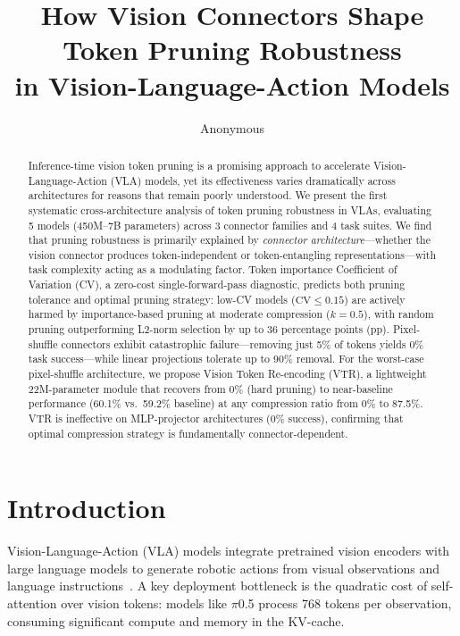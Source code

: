\documentclass[10pt,twocolumn]{article}
\title{How Vision Connectors Shape Token Pruning Robustness\\ in Vision-Language-Action Models}
\author{Anonymous}
\date{}
\begin{document}
\maketitle

\begin{abstract}
Inference-time vision token pruning is a promising approach to accelerate Vision-Language-Action (VLA) models, yet its effectiveness varies dramatically across architectures for reasons that remain poorly understood.
We present the first systematic cross-architecture analysis of token pruning robustness in VLAs, evaluating 5 models (450M--7B parameters) across 3 connector families and 4 task suites.
We find that pruning robustness is primarily explained by \emph{connector architecture}---whether the vision connector produces token-independent or token-entangling representations---with task complexity acting as a modulating factor.
Token importance Coefficient of Variation (CV), a zero-cost single-forward-pass diagnostic, predicts both pruning tolerance and optimal pruning strategy: low-CV models ($\text{CV}\!\leq\!0.15$) are actively harmed by importance-based pruning at moderate compression ($k\!=\!0.5$), with random pruning outperforming L2-norm selection by up to 36 percentage points (pp).
Pixel-shuffle connectors exhibit catastrophic failure---removing just 5\% of tokens yields 0\% task success---while linear projections tolerate up to 90\% removal.
For the worst-case pixel-shuffle architecture, we propose Vision Token Re-encoding (VTR), a lightweight 22M-parameter module that recovers from 0\% (hard pruning) to near-baseline performance (60.1\% vs.\ 59.2\% baseline) at any compression ratio from 0\% to 87.5\%.
VTR is ineffective on MLP-projector architectures (0\% success), confirming that optimal compression strategy is fundamentally connector-dependent.
\end{abstract}

\section{Introduction}

Vision-Language-Action (VLA) models integrate pretrained vision encoders with large language models to generate robotic actions from visual observations and language instructions~\cite{brohan2023rt2,kim2024openvla,black2024pi0}.
A key deployment bottleneck is the quadratic cost of self-attention over vision tokens: models like $\pi$0.5 process 768 tokens per observation, consuming significant compute and memory in the KV-cache.
\end{document}
